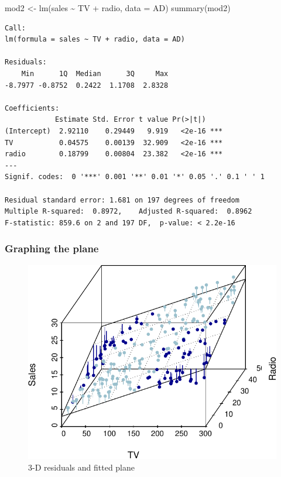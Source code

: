 \documentclass[
]{article}
\newenvironment{Shaded}{\begin{snugshade}}{\end{snugshade}}
\newcommand{\AttributeTok}[1]{\textcolor[rgb]{0.77,0.63,0.00}{#1}}
\newcommand{\FunctionTok}[1]{\textcolor[rgb]{0.00,0.00,0.00}{#1}}
\newcommand{\NormalTok}[1]{#1}
\newcommand{\OtherTok}[1]{\textcolor[rgb]{0.56,0.35,0.01}{#1}}
\newcommand{\SpecialCharTok}[1]{\textcolor[rgb]{0.00,0.00,0.00}{#1}}
\begin{document}
\begin{Shaded}
\begin{Highlighting}[]
\NormalTok{mod2 }\OtherTok{\textless{}{-}} \FunctionTok{lm}\NormalTok{(sales }\SpecialCharTok{\textasciitilde{}}\NormalTok{ TV }\SpecialCharTok{+}\NormalTok{ radio, }\AttributeTok{data =}\NormalTok{ AD)}
\FunctionTok{summary}\NormalTok{(mod2)}
\end{Highlighting}
\end{Shaded}

\begin{verbatim}
Call:
lm(formula = sales ~ TV + radio, data = AD)

Residuals:
    Min      1Q  Median      3Q     Max 
-8.7977 -0.8752  0.2422  1.1708  2.8328 

Coefficients:
            Estimate Std. Error t value Pr(>|t|)    
(Intercept)  2.92110    0.29449   9.919   <2e-16 ***
TV           0.04575    0.00139  32.909   <2e-16 ***
radio        0.18799    0.00804  23.382   <2e-16 ***
---
Signif. codes:  0 '***' 0.001 '**' 0.01 '*' 0.05 '.' 0.1 ' ' 1

Residual standard error: 1.681 on 197 degrees of freedom
Multiple R-squared:  0.8972,    Adjusted R-squared:  0.8962 
F-statistic: 859.6 on 2 and 197 DF,  p-value: < 2.2e-16
\end{verbatim}

\hypertarget{graphing-the-plane}{%
\subsubsection{Graphing the plane}\label{graphing-the-plane}}

\begin{figure}

{\centering \includegraphics{SDM-CHAP24_files/figure-latex/mucho-1} 

}

\caption{3-D residuals and fitted plane}\label{fig:mucho}
\end{figure}
\end{document}
